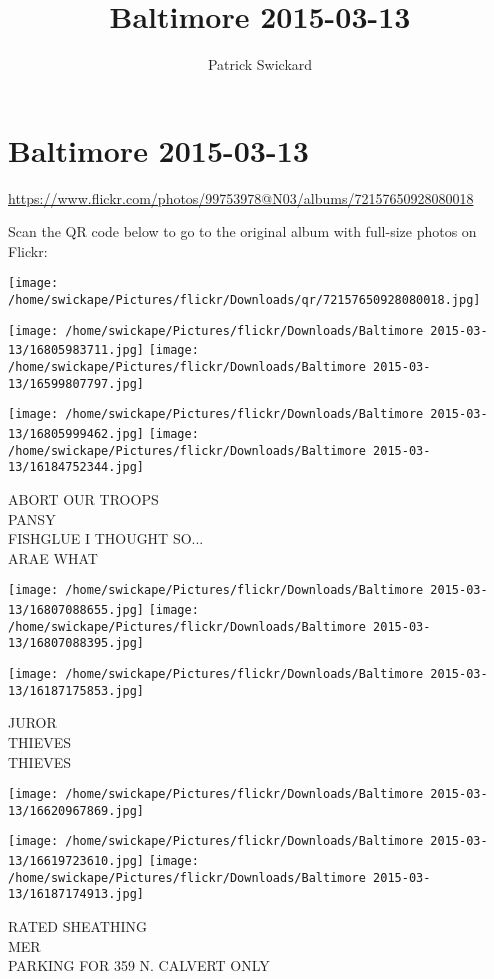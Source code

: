 \documentclass[10pt,letterpaper]{article}
\title{Baltimore 2015-03-13}
\author{Patrick Swickard}
\date{}
\begin{document}
\section*{Baltimore 2015-03-13}

\url{https://www.flickr.com/photos/99753978@N03/albums/72157650928080018}

Scan the QR code below to go to the original album with full-size photos on Flickr:

\texttt{[image: /home/swickape/Pictures/flickr/Downloads/qr/72157650928080018.jpg]}
\pagebreak

\texttt{[image: /home/swickape/Pictures/flickr/Downloads/Baltimore 2015-03-13/16805983711.jpg]}
\texttt{[image: /home/swickape/Pictures/flickr/Downloads/Baltimore 2015-03-13/16599807797.jpg]}

\texttt{[image: /home/swickape/Pictures/flickr/Downloads/Baltimore 2015-03-13/16805999462.jpg]}
\texttt{[image: /home/swickape/Pictures/flickr/Downloads/Baltimore 2015-03-13/16184752344.jpg]}

ABORT OUR TROOPS\\
PANSY\\
FISHGLUE I THOUGHT SO...\\
ARAE WHAT
\pagebreak

\texttt{[image: /home/swickape/Pictures/flickr/Downloads/Baltimore 2015-03-13/16807088655.jpg]}
\texttt{[image: /home/swickape/Pictures/flickr/Downloads/Baltimore 2015-03-13/16807088395.jpg]}

\texttt{[image: /home/swickape/Pictures/flickr/Downloads/Baltimore 2015-03-13/16187175853.jpg]}

JUROR\\
THIEVES\\
THIEVES
\pagebreak

\texttt{[image: /home/swickape/Pictures/flickr/Downloads/Baltimore 2015-03-13/16620967869.jpg]}

\vspace{0.25in}
\texttt{[image: /home/swickape/Pictures/flickr/Downloads/Baltimore 2015-03-13/16619723610.jpg]}
\texttt{[image: /home/swickape/Pictures/flickr/Downloads/Baltimore 2015-03-13/16187174913.jpg]}

RATED SHEATHING\\
MER\\
PARKING FOR 359 N. CALVERT ONLY
\pagebreak
\end{document}
